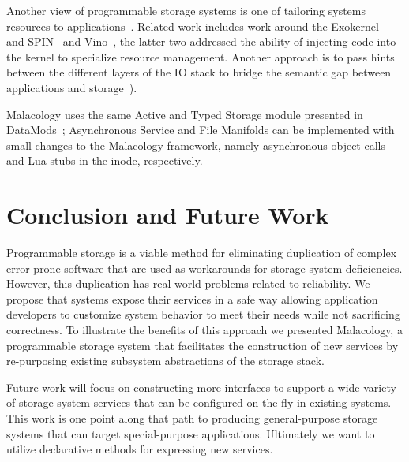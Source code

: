\documentclass[preprint]{sigplanconf-eurosys}
\begin{document}
Another view of programmable storage systems is one of tailoring systems
resources to applications~\cite{arpaci:sosp01}. Related work includes work
around the Exokernel~\cite{engler:sosp95} and SPIN~\cite{bershad:sosp95} and
Vino~\cite{seltzer:osdi96}, the latter two addressed the ability of injecting
code into the kernel to specialize resource management. Another approach is to
pass hints between the different layers of the IO stack to bridge the semantic
gap between applications and
storage~\cite{arpaci:sosp01,sivathanu:fast03,mesnier:sosp11}).

Malacology uses the same Active and Typed Storage module presented in
DataMods~\cite{watkins_datamods_2012}; Asynchronous Service and File Manifolds
can be implemented with small changes to the Malacology framework, namely
asynchronous object calls and Lua stubs in the inode, respectively.

\section{Conclusion and Future Work}\label{conclusion-and-future-work}

Programmable storage is a viable method for eliminating duplication of complex
error prone software that are used as workarounds for storage system
deficiencies. However, this duplication has real-world problems related to
reliability. We propose that systems expose their services in a safe way
allowing application developers to customize system behavior to meet their
needs while not sacrificing correctness. To illustrate the benefits of this
approach we presented Malacology, a programmable storage system that
facilitates the construction of new services by re-purposing existing subsystem
abstractions of the storage stack.

Future work will focus on constructing more interfaces to support a wide
variety of storage system services that can be configured on-the-fly in existing
systems. This work is one point along that path to producing general-purpose
storage systems that can
target  special-purpose applications.  Ultimately we want to utilize
declarative methods for expressing new services.



\end{document}
